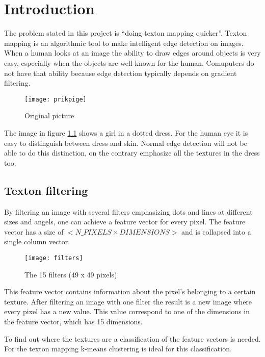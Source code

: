 \chapter{Introduction}
The problem stated in this project is ``doing texton mapping quicker''.
Texton mapping is an algorithmic tool to make intelligent edge detection on images. 
When a human looks at an image the ability to draw edges around objects is very easy, 
especially when the objects are well-known for the human. 
Comuputers do not have that ability because edge detection typically depends on gradient filtering.

\begin{figure}[H]
\centering
\texttt{[image: prikpige]}
\caption{Original picture}
\label{fig:prikpige}
\end{figure}

The image in figure \ref{fig:prikpige} shows a girl in a dotted dress. 
For the human eye it is easy to distinguish between dress and skin. 
Normal edge detection will not be able to do this distinction, 
on the contrary emphasize all the textures in the dress too.

\section{Texton filtering}
\label{sec:TextonFiltering}
By filtering an image with several filters emphasizing dots and lines at different sizes and angels, 
one can achieve a feature vector for every pixel. 
The feature vector has a size of $<N\_PIXELS\times DIMENSIONS>$ and is collapsed into a single column vector. 

\begin{figure}[H]
\centering
\texttt{[image: filters]}
\caption{The 15 filters (49 x 49 pixels)}
\label{fig:filtre}
\end{figure}


This feature vector contains information about the pixel's belonging to a certain texture. 
After filtering an image with one filter the result is a new image where every pixel has a new value. 
This value correspond to one of the dimensions in the feature vector, which has 15 dimensions.

To find out where the textures are a classification of the feature vectors is needed. 
For the texton mapping k-means clustering is ideal for this classification.


